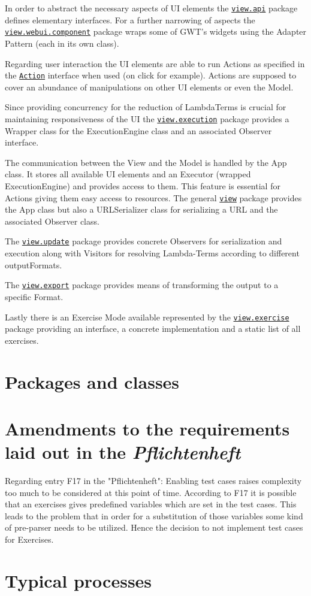 \documentclass[a4paper, parskip=half]{scrartcl}
\newcommand{\pkglnk}[1]{\hyperref[pkg:edu.kit.wavelength.client.#1]{#1}}
\begin{document}
In order to abstract the necessary aspects of UI elements the \texttt{\pkglnk{view.api}} package 
defines elementary interfaces.
For a further narrowing of aspects the \texttt{\pkglnk{view.webui.component}} package wraps some of 
GWT's widgets using the Adapter Pattern (each in its own class).

Regarding user interaction the UI elements are able to run Actions as specified in the 
\texttt{\hyperref[type:edu.kit.wavelength.client.view.action.Action]{Action}} interface when used (on click for example).
Actions are supposed to cover an abundance of manipulations on other UI elements or even the Model.

Since providing concurrency for the reduction of LambdaTerms is crucial for maintaining responsiveness of the UI 
the \texttt{\pkglnk{view.execution}} package provides a Wrapper class for the ExecutionEngine class and an associated
Observer interface.

The communication between the View and the Model is handled by the App class. It stores all available UI elements and
an Executor (wrapped ExecutionEngine) and provides access to them. This feature is essential for Actions giving them
easy access to resources.
The general \texttt{\pkglnk{view}} package provides the App class but also a URLSerializer class for serializing a URL
and the associated Observer class.

The \texttt{\pkglnk{view.update}} package provides concrete Observers for serialization and execution along with
Visitors for resolving Lambda-Terms according to different outputFormats.

The \texttt{\pkglnk{view.export}} package provides means of transforming the output to a specific Format.

Lastly there is an Exercise Mode available represented by the \texttt{\pkglnk{view.exercise}} package providing
an interface, a concrete implementation and a static list of all exercises.

\section{Packages and classes}


\section{Amendments to the requirements laid out in the \textit{Pflichtenheft}}

Regarding entry F17 in the "Pflichtenheft":
Enabling test cases raises complexity too much to be considered at this point of time.
According to F17 it is possible that an exercises gives predefined variables which
are set in the test cases. This leads to the problem that in order for a substitution of
those variables some kind of pre-parser needs to be utilized.
Hence the decision to not implement test cases for Exercises.

\section{Typical processes}

\end{document}
